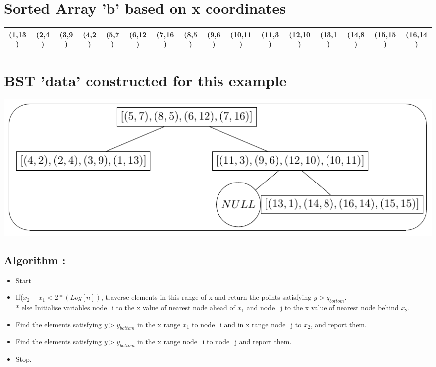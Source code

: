 \documentclass{article}
\begin{document}
\section*{Sorted Array 'b' based on x coordinates}
\hspace{-4.8cm}
\begin{tabular}{ |c|c|c|c|c|c|c|c|c|c|c|c|c|c|c|c|}
\hline
\cellcolor{red} (1,13) & (2,4) & (3,9) & (4,2) & \cellcolor{red} (5,7) & (6,12) & (7,16) & (8,5) & \cellcolor{red} (9,6) & (10,11) & (11,3) & (12,10) & \cellcolor{red} (13,1) & (14,8) & (15,15) & (16,14) \\ \hline
\end{tabular}
\section*{BST 'data' constructed for this example}
\includegraphics[scale=1]{bst.pdf}
\subsection{Algorithm : }
\begin{itemize}
\item[\bf STEP 1 : ]
Start
\item[\bf STEP 2 : ]
If($x_2 - x_1 < 2*(Log[n]) $, traverse elements in this range of x and return the points satisfying $y > y_{bottom}$. \\*
else Initialise variables node\_i to the x value of nearest node ahead of $x_1$ and node\_j to the x value of nearest node behind $x_2$.
\item[\bf STEP 3 : ]
Find the elements satisfying $y > y_{bottom}$ in the x range $x_1$ to node\_i and in x range node\_j to $x_2$, and report them.
\item[\bf STEP 4 : ]
Find the elements satisfying $y > y_{bottom}$ in the x range node\_i to node\_j and report them.
\item[\bf STEP 5 : ]
Stop.
\end{itemize}
\end{document}
